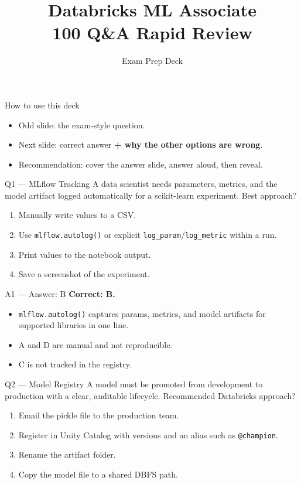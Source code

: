 \documentclass[aspectratio=169,10pt]{beamer}
\title{Databricks ML Associate\\100 Q\&A Rapid Review}
\author{Exam Prep Deck}
\date{}
\begin{document}
	
	\frame{\titlepage}
	
	\begin{frame}{How to use this deck}
		\begin{itemize}
			\item Odd slide: the exam-style question.
			\item Next slide: correct answer \textbf{+ why the other options are wrong}.
			\item Recommendation: cover the answer slide, answer aloud, then reveal.
		\end{itemize}
	\end{frame}
	
	
	\begin{frame}{Q1 — MLflow Tracking}
		A data scientist needs parameters, metrics, and the model artifact logged automatically for a scikit-learn experiment. Best approach?
		\begin{enumerate}[label=\Alph*.]
			\item Manually write values to a CSV.
			\item Use \texttt{mlflow.autolog()} or explicit \texttt{log\_param}/\texttt{log\_metric} within a run.
			\item Print values to the notebook output.
			\item Save a screenshot of the experiment.
		\end{enumerate}
	\end{frame}
	
	\begin{frame}{A1 — Answer: B}
		\textbf{Correct: B.}
		\begin{itemize}
			\item \texttt{mlflow.autolog()} captures params, metrics, and model artifacts for supported libraries in one line.
			\item A and D are manual and not reproducible.
			\item C is not tracked in the registry.
		\end{itemize}
	\end{frame}
	
	\begin{frame}{Q2 — Model Registry}
		A model must be promoted from development to production with a clear, auditable lifecycle. Recommended Databricks approach?
		\begin{enumerate}[label=\Alph*.]
			\item Email the pickle file to the production team.
			\item Register in Unity Catalog with versions and an alias such as \texttt{@champion}.
			\item Rename the artifact folder.
			\item Copy the model file to a shared DBFS path.
		\end{enumerate}
	\end{frame}
	
\end{document}
